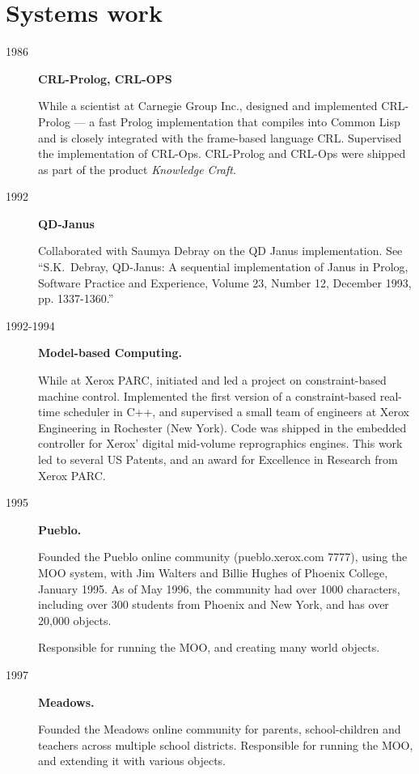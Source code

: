 \documentclass{article}
\begin{document}
\section*{Systems work}
\begin{description}

\item[1986]{\bf CRL-Prolog, CRL-OPS}

While a scientist at Carnegie Group Inc., designed and implemented
  CRL-Prolog --- a fast Prolog implementation that compiles into
  Common Lisp and is closely integrated with the frame-based language
  CRL.  Supervised the implementation of CRL-Ops.  CRL-Prolog
  and CRL-Ops were shipped as part of the product {\em Knowledge
  Craft}.

\item[1992]{\bf QD-Janus}

Collaborated with Saumya Debray on the QD Janus implementation. See
  ``S.K.~Debray, QD-Janus: A sequential implementation of Janus in
  Prolog, Software Practice and Experience, Volume 23, Number 12,
  December 1993, pp. 1337-1360.''

\item[1992-1994]{\bf Model-based Computing.} 

While at Xerox PARC, initiated and led a project on constraint-based
  machine control.  Implemented the first version of a
  constraint-based real-time scheduler in C++, and supervised a small
  team of engineers at Xerox Engineering in Rochester (New York).
  Code was shipped in the embedded controller for Xerox' digital
  mid-volume reprographics engines.  This work led to several US
  Patents, and an award for Excellence in Research from Xerox PARC.

\item[1995]{\bf Pueblo.}

Founded the Pueblo online community (pueblo.xerox.com 7777), using the
 MOO system, with Jim Walters and Billie Hughes of Phoenix College,
 January 1995. As of May 1996, the community had over 1000 characters,
 including over 300 students from Phoenix and New York, and has over
 20,000 objects.

 Responsible for running the MOO, and creating many world objects.

\item[1997]{\bf Meadows.}

 Founded the Meadows online community for parents, school-children and
 teachers across multiple school districts. Responsible for running
 the MOO, and extending it with various objects.


\end{description}
\end{document}

